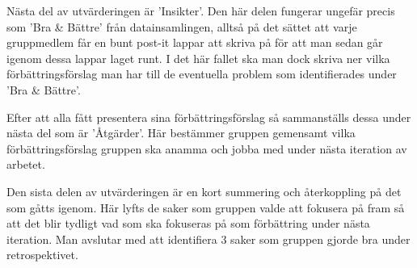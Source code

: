 Nästa del av utvärderingen är 'Insikter'. Den här delen fungerar ungefär precis som 'Bra \& Bättre' från datainsamlingen, alltså på det sättet att varje gruppmedlem får en bunt post-it lappar att skriva på för att man sedan går igenom dessa lappar laget runt. I det här fallet ska man dock skriva ner vilka förbättringsförslag man har till de eventuella problem som identifierades under 'Bra \& Bättre'.

Efter att alla fått presentera sina förbättringsförslag så sammanställs dessa under nästa del som är 'Åtgärder'. Här bestämmer gruppen gemensamt vilka förbättringsförslag gruppen ska anamma och jobba med under nästa iteration av arbetet.

Den sista delen av utvärderingen är en kort summering och återkoppling på det som gåtts igenom. Här lyfts de saker som gruppen valde att fokusera på fram så att det blir tydligt vad som ska fokuseras på som förbättring under nästa iteration.
Man avslutar med att identifiera 3 saker som gruppen gjorde bra under retrospektivet.



